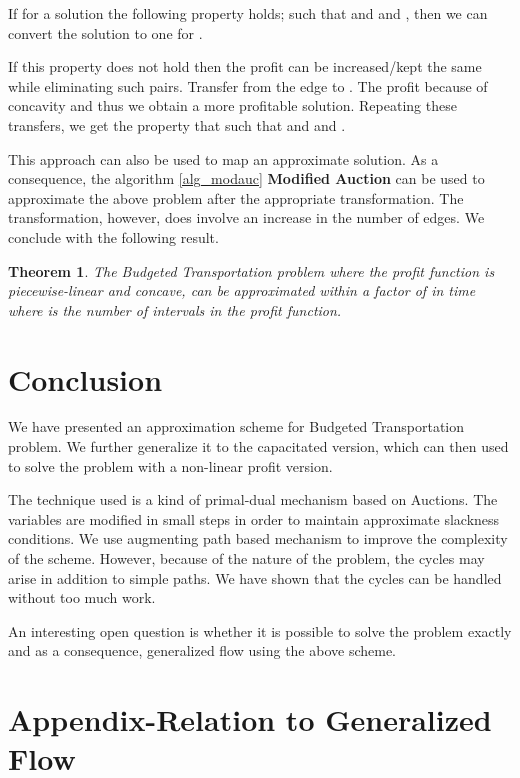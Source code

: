 \documentclass[11pt]{article}
\newtheorem{theorem}{Theorem}[section]
\newcounter{rem}
\begin{document}
If for a solution  the following property holds;   such that
  and  and , then we can convert the solution to one for . 

If this property does not hold then the profit can be increased/kept the same
while eliminating such pairs. Transfer 
from the edge  to . The profit  because of
concavity and thus we obtain a more profitable solution. 
Repeating these transfers, we get the property that
  such that
  and  and . 

This approach can also be used to map an approximate solution. As a consequence, the
algorithm \ref{alg_modauc} {\bf Modified Auction} can be used to approximate the above problem
after the appropriate transformation. The transformation, however,
does involve an increase in the number of edges. We conclude with the following result.

\begin{theorem}
The Budgeted Transportation problem where the profit function is piecewise-linear and concave,
can be approximated within a factor of  in 
 time
where  is the number of intervals in the profit function.
\end{theorem}

\section{Conclusion}
\label{sec_conc5}


We have presented an approximation scheme for Budgeted Transportation problem. We further
generalize it to the capacitated version, which can then used to solve the problem
with a non-linear profit version.

The technique used is a kind of primal-dual mechanism based on Auctions. The variables
are modified in small steps in order to maintain approximate slackness conditions. We
use augmenting path based mechanism to improve the complexity of the scheme. However,
because of the nature of the problem, the cycles may arise in addition to simple paths. 
We have shown that the cycles can be handled without too much work. 

An interesting open question is whether it is possible to solve the problem exactly and
as a consequence, generalized flow using the above scheme. 






\section{Appendix-Relation to Generalized Flow} 
\label{sec_relation}
\end{document}
